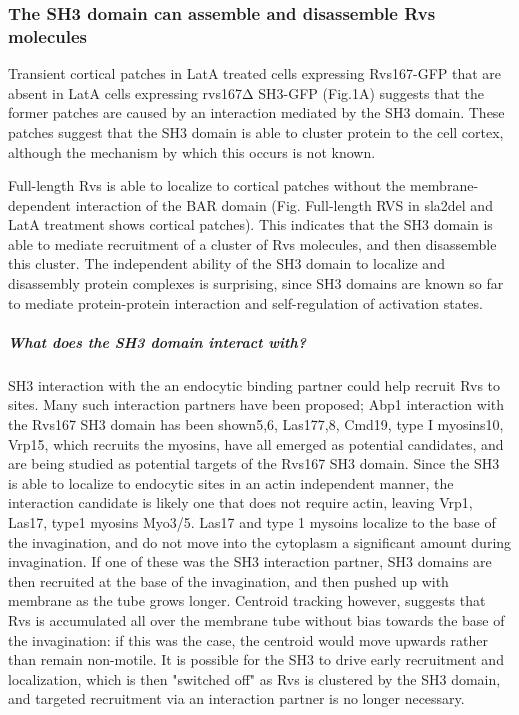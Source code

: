\subsubsection{The SH3 domain can assemble and disassemble Rvs molecules}
Transient cortical patches in LatA treated cells expressing Rvs167-GFP that are absent in LatA cells expressing rvs167Δ SH3-GFP (Fig.1A) suggests that the former patches are caused by an interaction mediated by the SH3 domain. These patches suggest that the SH3 domain is able to cluster protein to the cell cortex, although the mechanism by which this occurs is not known. 
	\vspace{5mm}
	
Full-length Rvs is able to localize to cortical patches without the membrane-dependent interaction of the BAR domain (Fig. Full-length RVS in sla2del and LatA treatment shows cortical patches). This indicates that the SH3 domain is able to mediate recruitment of a cluster of Rvs molecules, and then disassemble this cluster.  The independent ability of the SH3 domain to localize and disassembly protein complexes is surprising, since SH3 domains are known so far to mediate protein-protein interaction and self-regulation of activation states. 


\subparagraph{What does the SH3 domain interact with?}
SH3 interaction with the an endocytic binding partner could help recruit Rvs to sites. Many such interaction partners have been proposed; Abp1 interaction with the Rvs167 SH3 domain has been shown5,6, Las177,8, Cmd19, type I myosins10, Vrp15, which recruits the myosins, have all emerged as potential candidates, and are being studied as potential targets of the Rvs167 SH3 domain. Since the SH3 is able to localize to endocytic sites in an actin independent manner, the interaction candidate is likely one that does not require actin, leaving Vrp1, Las17, type1 myosins Myo3/5. Las17 and type 1 mysoins localize to the base of the invagination, and do not move into the cytoplasm a significant amount during invagination. If one of these was the SH3 interaction partner, SH3 domains are then recruited at the base of the invagination, and then pushed up with membrane as the tube grows longer. Centroid tracking however, suggests that Rvs is accumulated all over the membrane tube without bias towards the base of the invagination: if this was the case, the centroid would move upwards rather than remain non-motile. It is possible for the SH3 to drive early recruitment and localization, which is then "switched off" as Rvs is clustered by the SH3 domain, and targeted recruitment via an interaction partner is no longer necessary. 


